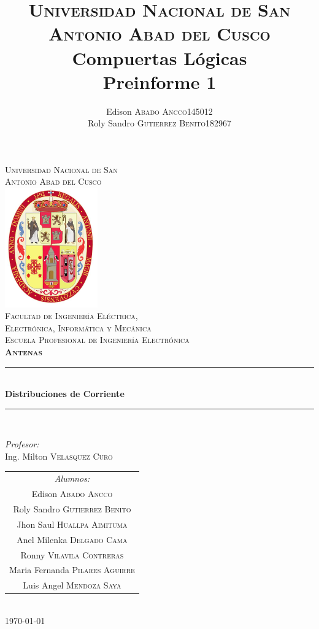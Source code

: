 \documentclass[11pt]{report}
\title{
	\textsc{Universidad Nacional de San Antonio Abad del Cusco}\\
	\textbf{Compuertas Lógicas}\\
	Preinforme 1}
\author{
	\begin{tabular}{lr}
		Edison \textsc{Abado Ancco} & 145012 \\
		Roly Sandro \textsc{Gutierrez Benito} & 182967\\
	\end{tabular}
}
\begin{document}
	
\begin{titlepage}
	\newcommand{\HRule}{\rule{\linewidth}{0.5mm}} 
	\center
	\textsc{\LARGE  Universidad Nacional de San \\[0.2cm] Antonio Abad del Cusco}\\[1.5cm] 
	\includegraphics[width=4cm]{IMAGENES/escudo}\\[1cm]
	\textsc{\Large Facultad de Ingeniería Eléctrica, \\ Electrónica, Informática y Mecánica}\\[0.5cm] 
	\textsc{\large Escuela Profesional de Ingeniería Electrónica}\\[0.5cm]
	\textsc{\Large \textbf{Antenas}}\\[0.5cm] 
	\HRule \\[0.4cm]
	{ \huge \bfseries Distribuciones de Corriente}\\[0.4cm] 
	\HRule \\[1.5cm]
	\begin{minipage}{\textwidth}
		\center 
		
		\emph{Profesor:} \\
		Ing. Milton \textsc{Velasquez Curo} \\[1cm]
		
		\begin{tabular}{c}
			\emph{Alumnos:}  \\
			Edison   \textsc{Abado Ancco} \\
			Roly Sandro    \textsc{Gutierrez Benito} \\
			Jhon Saul   \textsc{Huallpa Aimituma} \\
			Anel Milenka   \textsc{Delgado Cama} \\
			Ronny  \textsc{Vilavila Contreras} \\
			Maria Fernanda    \textsc{Pilares Aguirre} \\
			Luis Angel  \textsc{Mendoza Saya} \\
		\end{tabular}
	\end{minipage}\\[2cm]
	\today
\end{titlepage}
\end{document}

